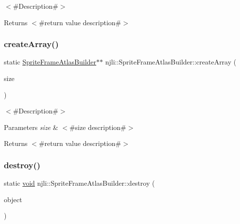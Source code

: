 $<$\#\+Description\#$>$

\begin{DoxyReturn}{Returns}
$<$\#return value description\#$>$ 
\end{DoxyReturn}
\mbox{\label{classnjli_1_1_sprite_frame_atlas_builder_a406c0a0878ee1a16d22bed1ff0d72a2d}} 
\subsubsection{\texorpdfstring{create\+Array()}{createArray()}}
{\footnotesize\ttfamily static \mbox{\hyperlink{classnjli_1_1_sprite_frame_atlas_builder}{Sprite\+Frame\+Atlas\+Builder}}$\ast$$\ast$ njli\+::\+Sprite\+Frame\+Atlas\+Builder\+::create\+Array (\begin{DoxyParamCaption}\item[{const \mbox{\hyperlink{_util_8h_a10e94b422ef0c20dcdec20d31a1f5049}{u32}}}]{size }\end{DoxyParamCaption})\hspace{0.3cm}{\ttfamily [static]}}

$<$\#\+Description\#$>$


\begin{DoxyParams}{Parameters}
{\em size} & $<$\#size description\#$>$\\
\hline
\end{DoxyParams}
\begin{DoxyReturn}{Returns}
$<$\#return value description\#$>$ 
\end{DoxyReturn}
\mbox{\label{classnjli_1_1_sprite_frame_atlas_builder_a844af7ae09c217f0af71bbf998d8af10}} 
\subsubsection{\texorpdfstring{destroy()}{destroy()}}
{\footnotesize\ttfamily static \mbox{\hyperlink{_thread_8h_af1e856da2e658414cb2456cb6f7ebc66}{void}} njli\+::\+Sprite\+Frame\+Atlas\+Builder\+::destroy (\begin{DoxyParamCaption}\item[{\mbox{\hyperlink{classnjli_1_1_sprite_frame_atlas_builder}{Sprite\+Frame\+Atlas\+Builder}} $\ast$}]{object }\end{DoxyParamCaption})\hspace{0.3cm}{\ttfamily [static]}}

